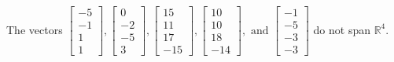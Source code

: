 \begin{exercise}
\begin{exerciseStatement}
  \end{exerciseStatement}
  \begin{exerciseAnswer}
   The vectors \(\left[\begin{array}{r}
-5 \\
-1 \\
1 \\
1
\end{array}\right] , \left[\begin{array}{r}
0 \\
-2 \\
-5 \\
3
\end{array}\right] , \left[\begin{array}{r}
15 \\
11 \\
17 \\
-15
\end{array}\right] , \left[\begin{array}{r}
10 \\
10 \\
18 \\
-14
\end{array}\right] , \text{ and } \left[\begin{array}{r}
-1 \\
-5 \\
-3 \\
-3
\end{array}\right]\) 
  	 do not  
	span \(\mathbb{R}^4\).
  


  \end{exerciseAnswer}
\end{exercise}